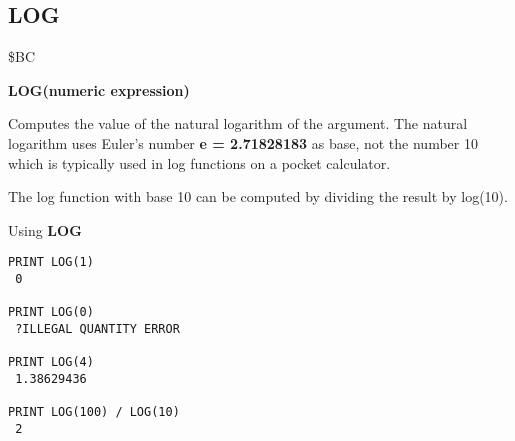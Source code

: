 \subsection{LOG}
\begin{description}[leftmargin=2cm,style=nextline]
\item [Token:] \$BC
\item [Format:] {\bf LOG(numeric expression)}
\item [Usage:] Computes
               the value of the natural logarithm of the argument.
               The natural logarithm uses
               Euler's number {\bf e = 2.71828183} as base,
               not the number 10 which is typically used
               in log functions on a pocket calculator.

\item [Remarks:] The log function with base 10 can be computed
                 by dividing the result by log(10).
\item [Example:] Using {\bf LOG}
\begin{tcolorbox}[colback=black,coltext=white]
\verbatimfont{\codefont}
\begin{verbatim}
PRINT LOG(1)
 0

PRINT LOG(0)
 ?ILLEGAL QUANTITY ERROR

PRINT LOG(4)
 1.38629436

PRINT LOG(100) / LOG(10)
 2
\end{verbatim}
\end{tcolorbox}
\end{description}


\newpage
